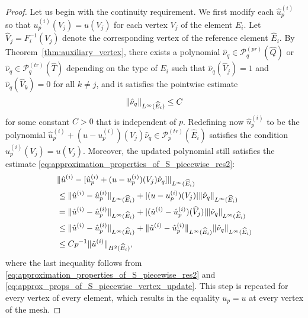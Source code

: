 \documentclass[english, 12pt, a4paper, sci, utf8, a-2b, online]{aaltothesis}
\theoremstyle{definition}
\theoremstyle{plain}
\DeclarePairedDelimiter\abs{\lvert}{\rvert}
\DeclarePairedDelimiter\norm{\lVert}{\rVert}
\numberwithin{equation}{section}
\begin{document}
\begin{proof}
    Let us begin with the continuity requirement.
    We first modify each $\hat{u}_p^{(i)}$ so that $u_p^{(i)}(V_j) = u(V_j)$
    for each vertex $V_j$ of the element $E_i$. Let $\widehat{V}_j = F_i^{-1}(V_j)$
    denote the corresponding vertex of the reference element $\widehat{E}_i$.
    By Theorem~\ref{thm:auxiliary_vertex}, there exists a polynomial
    $\hat{\nu}_q \in \mathcal{P}_q^{(pr)}(\widehat{Q})$ or
    $\hat{\nu}_q \in \mathcal{P}_q^{(tr)}(\widehat{T})$ depending on the type of $E_i$ such that
    $\hat{\nu}_q(\widehat{V}_j) = 1$ and $\hat{\nu}_q(\widehat{V}_k) = 0$ for all $k \neq j$,
    and it satisfies the pointwise estimate
    \begin{equation}
        \label{eq:approx_props_of_S_piecewise_vertex_update}
        \norm{\hat{\nu}_q}_{L^{\infty}(\widehat{E}_i)} \leq C
    \end{equation}
    for some constant $C > 0$ that is independent of $p$.
    Redefining now $\hat{u}_p^{(i)}$ to be the polynomial
    $\hat{u}_p^{(i)} + (u - u_p^{(i)})(V_j) \hat{\nu}_q \in \mathcal{P}_p^{(tr)}(\widehat{E}_i)$
    satisfies the condition $u_p^{(i)}(V_j) = u(V_j)$.
    Moreover, the updated polynomial still satisfies the estimate
    \eqref{eq:approximation_properties_of_S_piecewise_res2}:
    \begin{align*}
        &\norm{\hat{u}^{(i)} -
        [\hat{u}_p^{(i)} + (u - u_p^{(i)})(V_j) \hat{\nu}_q]}_{L^{\infty}(\widehat{E}_i)} \\
        &\leq \norm{\hat{u}^{(i)} - \hat{u}_p^{(i)}}_{L^{\infty}(\widehat{E}_i)}
            + \abs{(u - u_p^{(i)})(V_j)} \norm{\hat{\nu}_q}_{L^{\infty}(\widehat{E}_i)} \\
        &= \norm{\hat{u}^{(i)} - \hat{u}_p^{(i)}}_{L^{\infty}(\widehat{E}_i)}
            + \abs{(\hat{u}^{(i)} - \hat{u}_p^{(i)})(\widehat{V}_j)}
                \norm{\hat{\nu}_q}_{L^{\infty}(\widehat{E}_i)} \\
        &\leq \norm{\hat{u}^{(i)} - \hat{u}_p^{(i)}}_{L^{\infty}(\widehat{E}_i)}
            + \norm{\hat{u}^{(i)} - \hat{u}_p^{(i)}}_{L^{\infty}(\widehat{E}_i)}
                \norm{\hat{\nu}_q}_{L^{\infty}(\widehat{E}_i)} \\
        &\leq C p^{-1} \norm{\hat{u}^{(i)}}_{H^2(\widehat{E}_i)},
    \end{align*}
    where the last inequality follows from \eqref{eq:approximation_properties_of_S_piecewise_res2}
    and \eqref{eq:approx_props_of_S_piecewise_vertex_update}.
    This step is repeated for every vertex of every element,
    which results in the equality $u_p = u$ at every vertex of the mesh.


\end{proof}
\end{document}
